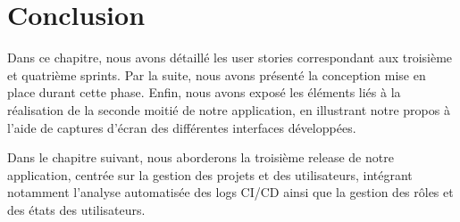 \section{Conclusion}
Dans ce chapitre, nous avons détaillé les user stories correspondant aux troisième et quatrième sprints. Par la suite, nous avons présenté la conception mise en place durant cette phase. Enfin, nous avons exposé les éléments liés à la réalisation de la seconde moitié de notre application, en illustrant notre propos à l’aide de captures d’écran des différentes interfaces développées.

Dans le chapitre suivant, nous aborderons la troisième release de notre application, centrée sur la gestion des projets et des utilisateurs, intégrant notamment l’analyse automatisée des logs CI/CD ainsi que la gestion des rôles et des états des utilisateurs.
